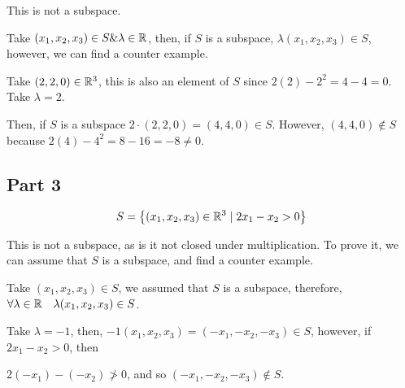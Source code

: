 \documentclass[12pt]{article} %
\begin{document}
\begin{homeworkProblem}
    This is not a subspace.

    Take $(x_1, x_2, x_3) \in S \& \lambda \in \mathbb{R}$, then, if $S$ is a subspace, $\lambda (x_1, x_2, x_3) \in S$, however, we can find a counter example.

    Take $(2, 2, 0) \in \mathbb{R}^3$, this is also an element of $S$ since $2(2) - 2^2 = 4 - 4 = 0$. Take $\lambda = 2$.

    Then, if $S$ is a subspace $2 \cdot (2, 2, 0) = (4, 4, 0) \in S$. However, $(4, 4, 0) \not \in S$ because $2(4) - 4^2 = 8 - 16 = -8 \not = 0$.



    \subsection*{Part 3}
    $$
        S = \left\{(x_1, x_2, x_3) \in \mathbb{R}^3 \mid 2x_1 - x_2 > 0\right\}
    $$

    This is not a subspace, as is it not closed under multiplication. To prove it, we can assume that $S$ is a subspace, and find a counter example.

    Take $(x_1, x_2, x_3) \in S$, we assumed that $S$ is a subspace, therefore, $\forall \lambda \in \mathbb{R} \quad \lambda (x_1, x_2, x_3) \in S$.

    Take $\lambda = -1$, then, $-1 (x_1, x_2, x_3) = (-x_1, -x_2, -x_3) \in S$, however, if $2x_1 - x_2 > 0$, then

    $2(-x_1) - (-x_2) \not> 0$, and so $(-x_1, -x_2, -x_3) \not \in S$.




\end{homeworkProblem}
\pagebreak
\end{document}
